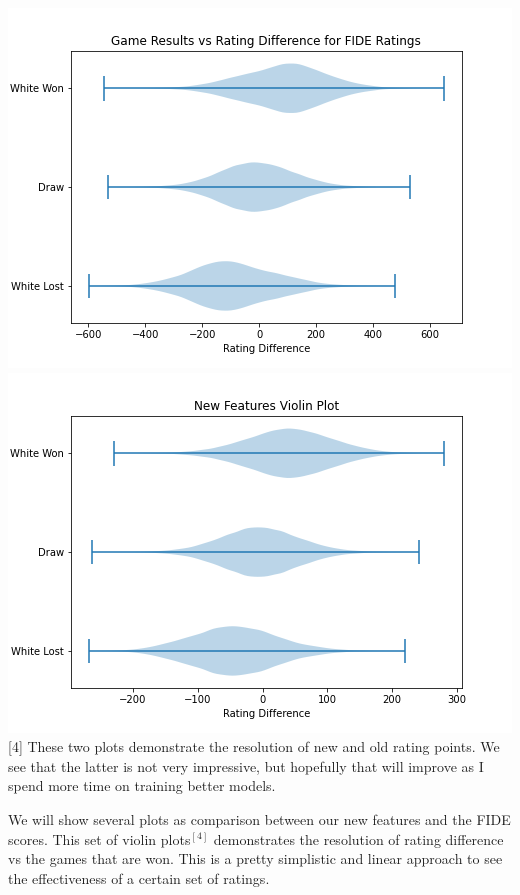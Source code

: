 \documentclass[12pt, letterpaper]{article}
\begin{document}
\begin{multicols}{2}
\setlength{\parskip}{0.0cm}
\begin{center}
\begin{small}
\includegraphics[width=\linewidth]{../figures/baseline_violin.png}
\includegraphics[width=\linewidth]{../figures/new_violin.png}
[4] These two plots demonstrate the resolution of new and old rating points. We see that the latter is not very impressive, but hopefully that will improve as I spend more time on training better models.
\end{small}
\end{center}
\setlength{\parskip}{0.1cm}

We will show several plots as comparison between our new features and the FIDE scores. This set of violin plots$^{[4]}$ demonstrates the resolution of rating difference vs the games that are won. This is a pretty simplistic and linear approach to see the effectiveness of a certain set of ratings.


\end{multicols}
\end{document}
